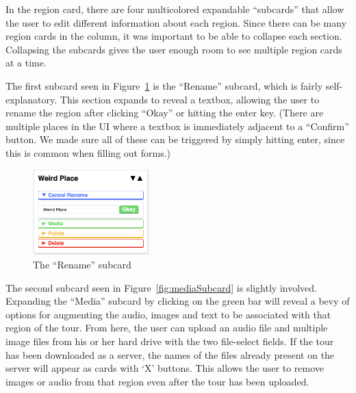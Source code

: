 \documentclass[a4paper, 10pt, american, titlepage]{article}
\begin{document}
In the region card, there are four multicolored expandable ``subcards'' that
allow the user to edit different information about each region. Since there can
be many region cards in the column, it was important to be able to collapse
each section. Collapsing the subcards gives the user enough room to see
multiple region cards at a time.

The first subcard seen in Figure~\ref{fig:renameSubcard} is the ``Rename''
subcard, which is fairly self-explanatory.  This section expands to reveal a
textbox, allowing the user to rename the region after clicking ``Okay'' or
hitting the enter key. (There are multiple places in the UI where a textbox is
immediately adjacent to a ``Confirm'' button.  We made sure all of these can be
triggered by simply hitting enter, since this is common when filling out
forms.)

\begin{figure}[h]
	\centering
	\includegraphics[width=0.4\textwidth]{rename-subcard-editour.png}
	\caption{The ``Rename'' subcard}
	\label{fig:renameSubcard}
\end{figure}

The second subcard seen in Figure~\ref{fig:mediaSubcard} is slightly involved.
Expanding the ``Media'' subcard by clicking on the green bar will reveal a bevy
of options for augmenting the audio, images and text to be associated with that
region of the tour. From here, the user can upload an audio file and multiple
image files from his or her hard drive with the two file-select fields. If the
tour has been downloaded as a server, the names of the files already present on
the server will appear as cards with `X' buttons. This allows the user to
remove images or audio from that region even after the tour has been uploaded.
\end{document}
